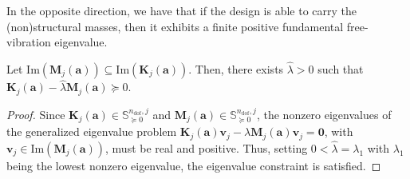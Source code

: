 \documentclass[final,onefignum,onetabnum]{siamart220329}
\newtheorem*{proof}{Proof}%
\begin{document}
{In the opposite direction}, we have {that if the design is able to carry the (non)structural masses, then it exhibits a finite positive fundamental free-vibration eigenvalue.}

%
%
%
\begin{proposition}\label{prop:exists_gamma_fv}
	Let $\mathrm{Im}(\mathbf{M}_j(\mathbf{a})) \subseteq \mathrm{Im}(\mathbf{K}_j(\mathbf{a}))$. Then, there exists $\hat{\lambda}>0$ such that
	$\mathbf{K}_j(\mathbf{a}) - \hat{\lambda} \mathbf{M}_j(\mathbf{a})\succeq 0$.
\end{proposition}
\begin{proof}
Since $\mathbf{K}_j(\mathbf{a}) \in \mathbb{S}^{{n_\mathrm{dof},j}}_{\succeq 0}$ and $\mathbf{M}_j(\mathbf{a}) \in \mathbb{S}^{{n_\mathrm{dof},j}}_{\succeq 0}$, the nonzero eigenvalues of the generalized eigenvalue problem $\mathbf{K}_j(\mathbf{a})\mathbf{v}_j - \lambda \mathbf{M}_j(\mathbf{a}) \mathbf{v}_j = \mathbf{0}$, with $\mathbf{v}_j \in \mathrm{Im}\left(\mathbf{M}_j(\mathbf{a})\right)$, must be real and positive. Thus, setting $0<\hat{\lambda}= \lambda_1$ with $\lambda_1$ being the lowest nonzero eigenvalue, the eigenvalue constraint is satisfied.
\end{proof}
\end{document}
